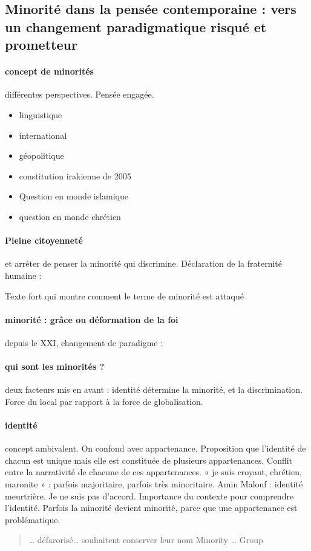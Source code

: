 \subsection{Minorité dans la pensée contemporaine : vers un changement paradigmatique risqué et prometteur }
\paragraph{concept de minorités} différentes perspectives. Pensée engagée.

\begin{itemize}
\item linguistique
\item international
\item géopolitique
\item constitution irakienne de 2005
\item Question en monde islamique
\item question en monde chrétien
\end{itemize}

\paragraph{Pleine citoyenneté} et arrêter de penser la minorité qui discrimine. 
Déclaration de la fraternité humaine : 
\begin{quote}
\end{quote}
Texte fort qui montre comment le terme de minorité est attaqué

\paragraph{minorité : grâce ou déformation de la foi} depuis le XXI, changement de paradigme : 

\paragraph{qui sont les minorités ?} deux facteurs mis en avant : identité détermine la minorité, et la discrimination. Force du local par rapport à la force de globalisation.

\paragraph{identité} concept ambivalent. On confond avec appartenance. Proposition que l’identité de chacun est unique mais elle est constituée de plusieurs appartenances. Conflit entre la narrativité de chacune de ces appartenances.  « je suis croyant, chrétien, maronite » : parfois majoritaire, parfois très minoritaire. 
Amin Malouf : identité meurtrière. Je ne suis pas d’accord. 
Importance du contexte pour comprendre l’identité. Parfois la minorité devient minorité, parce que une appartenance est problématique.
\begin{quote}
… défarorisé… souhaitent conserver leur nom
Minority …  Group
\end{quote}


